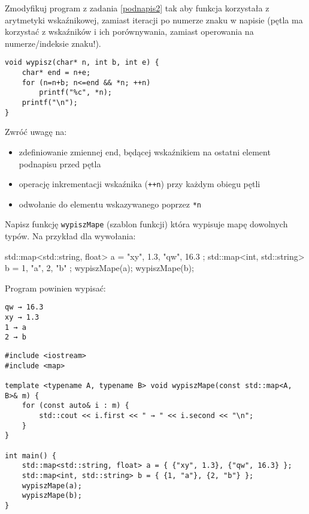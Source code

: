 \dbEntryCheckResults
Zmodyfikuj program z zadania \ref{podnapis2} tak aby funkcja korzystała z arytmetyki wskaźnikowej, zamiast iteracji po numerze znaku w napisie (pętla ma korzystać z wskaźników i ich porównywania, zamiast operowania na numerze/indeksie znaku!).
\fi

\dbEntryCheckResults
\begin{verbatim}
void wypisz(char* n, int b, int e) {
	char* end = n+e;
	for (n=n+b; n<=end && *n; ++n)
		printf("%c", *n);
	printf("\n");
}
\end{verbatim}

\noindent Zwróć uwagę na:
\begin{itemize}
\item zdefiniowanie zmiennej end, będącej wskaźnikiem na ostatni element podnapisu przed pętla
\item operację inkrementacji wskaźnika (\Verb$++n$) przy każdym obiegu pętli
\item odwołanie do elementu wskazywanego poprzez \Verb$*n$
\end{itemize}
\fi


\dbEntryCheckResults
Napisz funkcję \Verb#wypiszMape# (szablon funkcji) która wypisuje mapę dowolnych typów. Na przykład dla wywołania:
\begin{CodeFrame*}[cpp]{}
std::map<std::string, float> a = { {"xy", 1.3}, {"qw", 16.3} };
std::map<int, std::string> b = { {1, "a"}, {2, "b"} };
wypiszMape(a);
wypiszMape(b);
\end{CodeFrame*}
\vspace{-8pt}Program powinien wypisać:
\vspace{-8pt}\begin{Verbatim}
qw → 16.3
xy → 1.3
1 → a
2 → b
\end{Verbatim}
\fi

\dbEntryCheckResults
\begin{verbatim}
#include <iostream>
#include <map>

template <typename A, typename B> void wypiszMape(const std::map<A, B>& m) {
	for (const auto& i : m) {
		std::cout << i.first << " → " << i.second << "\n";
	}
}

int main() {
	std::map<std::string, float> a = { {"xy", 1.3}, {"qw", 16.3} };
	std::map<int, std::string> b = { {1, "a"}, {2, "b"} };
	wypiszMape(a);
	wypiszMape(b);
}
\end{verbatim}

